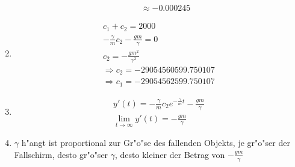\documentclass[fleqn,12pt]{scrartcl}
\begin{document}
\begin{enumerate}
\begin{align*}
									 & & \approx -0.000245
		\end{align*}
								 \item
		\begin{align*}
			c_1 + c_2 = 2000\\
			-\frac\gamma{m}c_2 - \frac{gm}\gamma = 0\\
			c_2 = -\frac{gm^2}{\gamma^2}\\
			\Rightarrow c_2 = -29054560599.750107\\
			\Rightarrow c_1 = -29054562599.750107
		\end{align*}
	\item
		\begin{align*}
			y'(t) = -\frac{\gamma}m c_2e^{-\frac\gamma{m}t} - \frac{g m}\gamma\\
			\lim_{t\rightarrow \infty} y'(t) = -\frac{gm}\gamma
		\end{align*}
		
	\item
		$\gamma$ h"angt ist proportional zur Gr"o"se des fallenden Objekts, je gr"o"ser der Fallschirm, desto gr"o"ser $\gamma$, desto kleiner der Betrag von $-\frac{gm}\gamma$

\end{enumerate}
\end{document}
